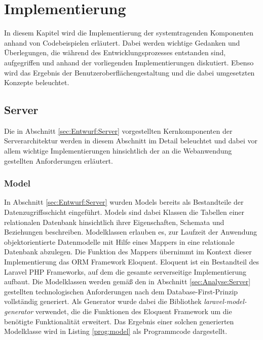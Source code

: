 \chapter{Implementierung}
\label{cha:Implementierung}

In diesem Kapitel wird die Implementierung der systemtragenden Komponenten anhand von Codebeispielen erläutert. Dabei werden wichtige Gedanken und Überlegungen, die während des Entwicklungsprozesses entstanden sind, aufgegriffen und anhand der vorliegenden Implementierungen diskutiert. Ebenso wird das Ergebnis der Benutzeroberflächengestaltung und die dabei umgesetzten Konzepte beleuchtet.

\section{Server}

Die in Abschnitt \ref{sec:Entwurf:Server} vorgestellten Kernkomponenten der Serverarchitektur werden in diesem Abschnitt im Detail beleuchtet und dabei vor allem wichtige Implementierungen hinsichtlich der an die Webanwendung gestellten Anforderungen erläutert.

\subsection{Model}

In Abschnitt \ref{sec:Entwurf:Server} wurden Models bereits als Bestandteile der Datenzugriffsschicht eingeführt. Models sind dabei Klassen die Tabellen einer relationalen Datenbank hinsichtlich ihrer Eigenschaften, Schemata und Beziehungen beschreiben. Modelklassen erlauben es, zur Laufzeit der Anwendung objektorientierte Datenmodelle mit Hilfe eines Mappers in eine relationale Datenbank abzulegen. Die Funktion des Mappers übernimmt im Kontext dieser Implementierung das \acf{ORM} Framework Eloquent. Eloquent ist ein Bestandteil des Laravel PHP Frameworks, auf dem die gesamte serverseitige Implementierung aufbaut. Die Modelklassen werden gemäß den in Abschnitt \ref{sec:Analyse:Server} gestellten technologischen Anforderungen nach dem Database-First-Prinzip vollständig generiert. Als Generator wurde dabei die Bibliothek \emph{laravel-model-generator} verwendet, die die Funktionen des Eloquent Framework um die benötigte Funktionalität erweitert. Das Ergebnis einer solchen generierten Modelklasse wird in Listing \ref{prog:model} als Programmcode dargestellt.

